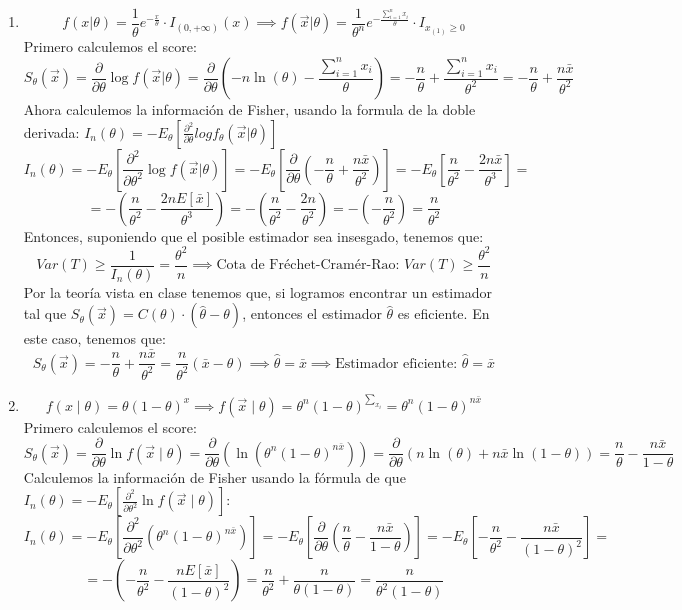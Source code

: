 \begin{sol}
  \begin{enumerate}
    \item 
      $$f(x | \theta) = \frac{1}{\theta}e^{-\frac{x}{\theta}} \cdot I_{(0, +\infty)}(x) \implies f(\vec{x} | \theta) = \frac{1}{\theta^n} e^{-\frac{\sum_{i=1}^{n} x_i}{\theta}} \cdot I_{x_{(1)} \geq 0}$$
    Primero calculemos el score: 
      $$S_{\theta}(\vec{x}) = \frac{\partial}{\partial \theta} \log f(\vec{x} | \theta) = \frac{\partial}{\partial \theta} \left(-n \ln(\theta) - \frac{\sum_{i=1}^{n} x_i}{\theta}\right) = -\frac{n}{\theta} + \frac{\sum_{i=1}^{n} x_i}{\theta^2} = -\frac{n}{\theta} + \frac{n\bar{x}}{\theta^2}$$
      Ahora calculemos la información de Fisher, usando la formula de la doble derivada: $I_n(\theta) = -E_{\theta}[\frac{\partial^2}{\partial\theta} log f_{\theta}(\vec{x} | \theta)]$
      $$I_n(\theta) = -E_{\theta}\left[\frac{\partial^2}{\partial \theta^2} \log f(\vec{x} | \theta)\right] = -E_{\theta}\left[\frac{\partial}{\partial \theta} \left(-\frac{n}{\theta} + \frac{n\bar{x}}{\theta^2}\right)\right] = -E_{\theta}\left[\frac{n}{\theta^2} -\frac{2n\bar{x}}{\theta^3}\right] = $$
      $$ = -\left(\frac{n}{\theta^2} - \frac{2nE[\bar{x}]}{\theta^3}\right) = -\left(\frac{n}{\theta^2} - \frac{2n}{\theta^2}\right) = -\left(-\frac{n}{\theta^2}\right) = \frac{n}{\theta^2}$$
      Entonces, suponiendo que el posible estimador sea insesgado, tenemos que: 
      $$Var(T) \geq \frac{1}{I_n(\theta)} = \frac{\theta^2}{n} \implies \text{Cota de Fréchet-Cramér-Rao: } Var(T) \geq \frac{\theta^2}{n}$$
      Por la teoría vista en clase tenemos que, si logramos encontrar un estimador tal que $S_{\theta}(\vec{x}) = C(\theta) \cdot (\hat{\theta} - \theta)$, entonces el estimador $\hat{\theta}$ es eficiente. En este caso, tenemos que:
      $$S_{\theta}(\vec{x}) = -\frac{n}{\theta} + \frac{n\bar{x}}{\theta^2} = \frac{n}{\theta^2}(\bar{x} - \theta) \implies \hat{\theta} = \bar{x} \implies \text{Estimador eficiente: } \hat{\theta} = \bar{x}$$
    \item 
      $$f(x \mid \theta) = \theta(1 - \theta)^x \implies f(\vec{x} \mid \theta) = \theta^n (1 - \theta)^{\sum_{x_i}} = \theta^n (1 - \theta)^{n\bar{x}}$$
      Primero calculemos el score:
      $$S_{\theta}(\vec{x}) = \frac{\partial}{\partial \theta} \ln f(\vec{x} \mid \theta) = \frac{\partial}{\partial \theta} \left(\ln\left(\theta^n(1 - \theta)^{n\bar{x}}\right)\right) = \frac{\partial}{\partial \theta} \left(n \ln(\theta) + n\bar{x} \ln(1 - \theta)\right) = \frac{n}{\theta} - \frac{n\bar{x}}{1 - \theta}$$
      Calculemos la información de Fisher usando la fórmula de que $I_n(\theta) = -E_{\theta}\left[\frac{\partial^2}{\partial \theta^2} \ln f(\vec{x} \mid \theta)\right]$:
      $$I_n(\theta) = -E_{\theta}\left[\frac{\partial^2}{\partial\theta^2}\left(\theta^n(1 - \theta)^{n\bar{x}}\right)\right] = -E_{\theta}\left[\frac{\partial}{\partial \theta}\left(\frac{n}{\theta} - \frac{n\bar{x}}{1 - \theta}\right)\right] = -E_{\theta}\left[-\frac{n}{\theta^2} - \frac{n\bar{x}}{(1 - \theta)^2}\right] = $$
      $$ = -\left(-\frac{n}{\theta^2} - \frac{nE[\bar{x}]}{(1 - \theta)^2}\right) = \frac{n}{\theta^2} + \frac{n}{\theta(1 - \theta)} = \frac{n}{\theta^2(1 - \theta)}$$
      

\end{enumerate}
\end{sol}
